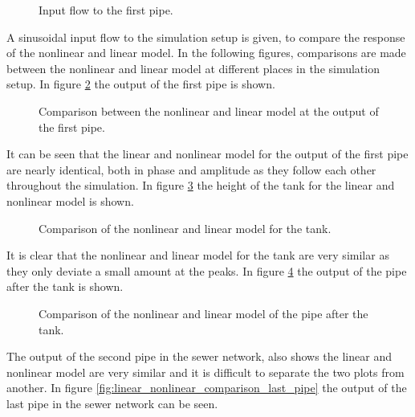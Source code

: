 \begin{figure}[H]
 \centering
 
\caption{Input flow to the first pipe.}
\label{fig:linear_nonlinear_comparison_input_to_first_pipe}
\end{figure}
A sinusoidal input flow to the simulation setup is given, to compare the response of the nonlinear and linear model. 
In the following figures, comparisons are made between the nonlinear and linear model at different places in the simulation setup. In figure \ref{fig:linear_nonlinear_comparison_input_first_pipe_into_tank} the output of the first pipe is shown.

\begin{figure}[H]
 \centering
 
\caption{Comparison between the nonlinear and linear model at the output of the first pipe.}
\label{fig:linear_nonlinear_comparison_input_first_pipe_into_tank}
\end{figure}

It can be seen that the linear and nonlinear model for the output of the first pipe are nearly identical, both in phase and amplitude as they follow each other throughout the simulation. In figure \ref{fig:linear_nonlinear_comparison_tank_height} the height of the tank for the linear and nonlinear model is shown.   

\begin{figure}[H]
 \centering
 
\caption{Comparison of the nonlinear and linear model for the tank. }
\label{fig:linear_nonlinear_comparison_tank_height}
\end{figure}
 
It is clear that the nonlinear and linear model for the tank are very similar as they only deviate a small amount at the peaks. In figure \ref{fig:linear_nonlinear_comparison_pipe_after_tank} the output of the pipe after the tank is shown.  

\begin{figure}[H]
 \centering
 
\caption{Comparison of the nonlinear and linear model of the pipe after the tank.}
\label{fig:linear_nonlinear_comparison_pipe_after_tank}
\end{figure}
  
The output of the second pipe in the sewer network, also shows the linear and nonlinear model are very similar and it is difficult to separate the two plots from another. In figure \ref{fig:linear_nonlinear_comparison_last_pipe} the output of the last pipe in the sewer network can be seen. 

